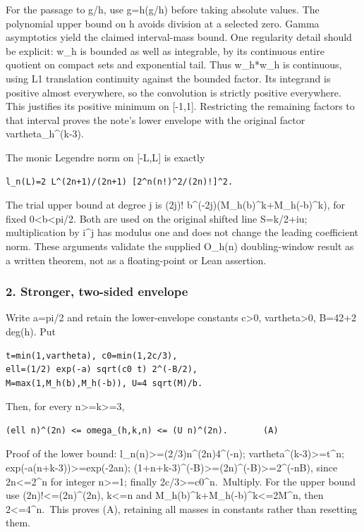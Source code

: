 For the passage to \textbar g/h\textbar, use g=h(g/h) before taking absolute values. The polynomial upper bound on \textbar h\textbar{} avoids division at a selected zero. Gamma asymptotics yield the claimed interval-mass bound. One regularity detail should be explicit: w\_h is bounded as well as integrable, by its continuous entire quotient on compact sets and exponential tail. Thus w\_h*w\_h is continuous, using L1 translation continuity against the bounded factor. Its integrand is positive almost everywhere, so the convolution is strictly positive everywhere. This justifies its positive minimum on {[}-1,1{]}. Restricting the remaining factors to that interval proves the note's lower envelope with the original factor vartheta\_h\^{}(k-3).

The monic Legendre norm on {[}-L,L{]} is exactly

\begin{verbatim}
l_n(L)=2 L^(2n+1)/(2n+1) [2^n(n!)^2/(2n)!]^2.
\end{verbatim}

The trial upper bound at degree j is (2j)! b\^{}(-2j)(M\_h(b)\^{}k+M\_h(-b)\^{}k), for fixed 0\textless b\textless pi/2. Both are used on the original shifted line S=k/2+iu; multiplication by i\^{}j has modulus one and does not change the leading coefficient norm. These arguments validate the supplied O\_h(n) doubling-window result as a written theorem, not as a floating-point or Lean assertion.

\subsubsection{2. Stronger, two-sided envelope}\label{endpoint-pr25_norm_original--stronger-two-sided-envelope}

Write a=pi/2 and retain the lower-envelope constants c\textgreater0, vartheta\textgreater0, B=42+2 deg(h). Put

\begin{verbatim}
t=min(1,vartheta), c0=min(1,2c/3),
ell=(1/2) exp(-a) sqrt(c0 t) 2^(-B/2),
M=max(1,M_h(b),M_h(-b)), U=4 sqrt(M)/b.
\end{verbatim}

Then, for every n\textgreater=k\textgreater=3,

\begin{verbatim}
(ell n)^(2n) <= omega_(h,k,n) <= (U n)^(2n).       (A)
\end{verbatim}

Proof of the lower bound: l\_n(n)\textgreater=(2/3)n\^{}(2n)4\^{}(-n); vartheta\^{}(k-3)\textgreater=t\^{}n; exp(-a(n+k-3))\textgreater=exp(-2an); (1+n+k-3)\^{}(-B)\textgreater=(2n)\^{}(-B)\textgreater=2\^{}(-nB), since 2n\textless=2\^{}n for integer n\textgreater=1; finally 2c/3\textgreater=c0\^{}n.~Multiply. For the upper bound use (2n)!\textless=(2n)\^{}(2n), k\textless=n and M\_h(b)\^{}k+M\_h(-b)\^{}k\textless=2M\^{}n, then 2\textless=4\^{}n.~This proves (A), retaining all masses in constants rather than resetting them.

